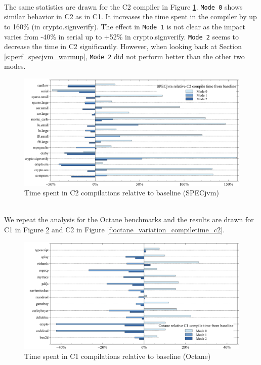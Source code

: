 \\
The same statistics are drawn for the C2 compiler in Figure \ref{f:all_variation_compiletime_c2}. 
\texttt{Mode 0} shows similar behavior in C2 as in C1. It increases the time spent in the compiler by up to 160\% (in crypto.signverify).
The effect in \texttt{Mode 1} is not clear as the impact varies from -40\% in serial up to +52\% in crypto.signverify. \texttt{Mode 2} seems to decrease the time in C2 significantly. However, when looking back at Section \ref{s:perf_specjvm_warmup}, \texttt{Mode 2} did not perform better than the other two modes.
\begin{figure}[ht!]
  \begin{center}
    \centering
    \includegraphics[width=1.0\textwidth]{figures/all_variation_compiletime_c2.png}
    \caption{Time spent in C2 compilations relative to baseline (SPECjvm)}
    \label{f:all_variation_compiletime_c2}
  \end{center}
\end{figure}
\\
We repeat the analysis for the Octane benchmarks and the results are drawn for C1 in Figure \ref{f:octane_variation_compiletime_c1} and C2 in Figure \ref{f:octane_variation_compiletime_c2}.\\
\begin{figure}[ht]
  \begin{center}
    \centering
    \includegraphics[width=1.0\textwidth]{figures/octane_variation_compiletime_c1.png}
    \caption{Time spent in C1 compilations relative to baseline (Octane)}
    \label{f:octane_variation_compiletime_c1}
  \end{center}
\end{figure}

